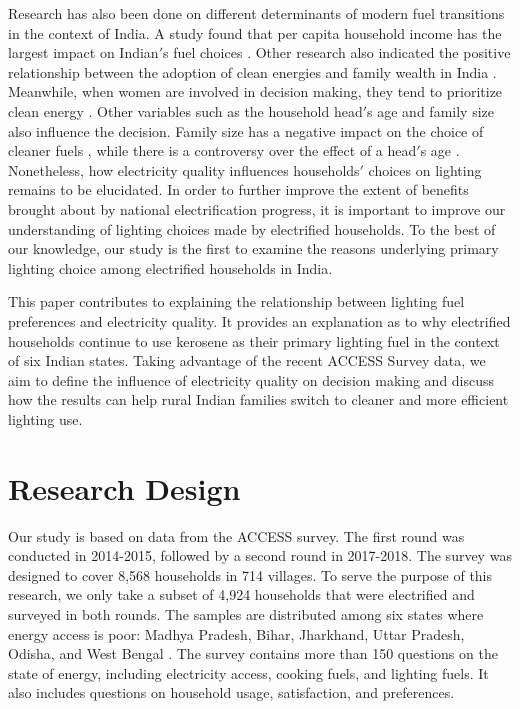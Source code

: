 \documentclass[11pt,english]{article}
\theoremstyle{plain} \newtheorem{claim}{Claim}
\theoremstyle{plain} \newtheorem{prop}{Proposition}
\theoremstyle{plain} \newtheorem{hypo}{Hypothesis}
\begin{document}
Research has also been done on different determinants of modern fuel transitions in the context of India. A study found that per capita household income has the largest impact on Indian$'$s fuel choices \citep{Pachaurietal2004}. Other research also indicated the positive relationship between the adoption of clean energies and family wealth in India \citep{Khandkeretal2012, Beheraetal2015}. Meanwhile, when women are involved in decision making, they tend to prioritize clean energy \citep{Rahutetal2016}. Other variables such as the household head$'$s age and family size also influence the decision. Family size has a negative impact on the choice of cleaner fuels \citep{PandeyChaubal2011}, while there is a controversy over the effect of a head$'$s age \citep{Rahutetal2016, RaoReddy2007}. Nonetheless, how electricity quality influences households$'$ choices on lighting remains to be elucidated. In order to further improve the extent of benefits brought about by national electrification progress, it is important to improve our understanding of lighting choices made by electrified households. To the best of our knowledge, our study is the first to examine the reasons underlying primary lighting choice among electrified households in India.

This paper contributes to explaining the relationship between lighting fuel preferences and electricity quality. It provides an explanation as to why electrified households continue to use kerosene as their primary lighting fuel in the context of six Indian states. Taking advantage of the recent ACCESS Survey data, we aim to define the influence of electricity quality on decision making and discuss how the results can help rural Indian families switch to cleaner and more efficient lighting use.

\section{Research Design}

Our study is based on data from the ACCESS survey. The first round was conducted in 2014-2015, followed by a second round in 2017-2018. The survey was designed to cover 8,568 households in 714 villages. To serve the purpose of this research, we only take a subset of 4,924 households that were electrified and surveyed in both rounds. The samples are distributed among six states where energy access is poor: Madhya Pradesh, Bihar, Jharkhand, Uttar Pradesh, Odisha, and West Bengal \citep{Aklinetal12016, Jainetal2018}. The survey contains more than 150 questions on the state of energy, including electricity access, cooking fuels, and lighting fuels. It also includes questions on household usage, satisfaction, and preferences.
\end{document}
